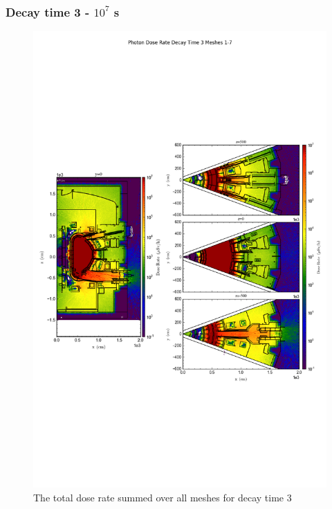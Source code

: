 \documentclass[12pt]{article}
\begin{document}
\subsubsection{Decay time 3 - $10^7$ s}
\begin{figure}[ht!]
\centering
\includegraphics[trim={0cm 9cm 0cm 10cm},clip,scale=0.75]{../plots/final_model/Photon_Dose_Rate_Decay_Time_3_Meshes_1-7.png}
\caption{The total dose rate summed over all meshes for decay time 3}
\label{fig:photons_dc3_no4bc_total}
\end{figure}
\end{document}
